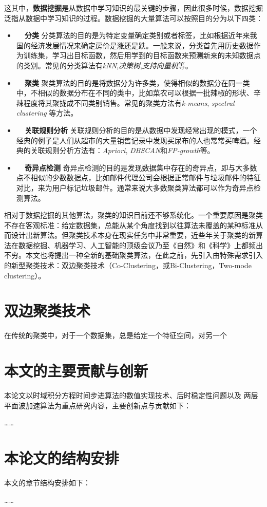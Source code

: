 \vspace{2mm}
这其中，\textbf{数据挖掘}是从数据中学习知识的最关键的步骤，因此很多时候，数据挖掘泛指从数据中学习知识的过程。数据挖掘的大量算法可以按照目的分为以下四类：

\begin{itemize}
    \item \textbf{~~分类} 分类算法的目的是为特定变量确定类别或者标签，比如根据近年来我国的经济发展情况来确定房价是涨还是跌。一般来说，分类首先用历史数据作为训练集，学习出目标函数，然后用学到的目标函数来预测新来的未知数据点的类别。常见的分类算法有\emph{kNN}\cite{peterson2009k},\emph{决策树}\cite{quinlan1986induction},\emph{支持向量机}\cite{cortes1995support}等。
    \item \textbf{~~聚类} 聚类算法的目的是将数据分为许多类，使得相似的数据分在同一类中，不相似的数据分布在不同的类中，比如菜农可以根据一批辣椒的形状、辛辣程度将其聚拢成不同类别销售。常见的聚类方法有\emph{k-means}\cite{hartigan1979algorithm}, \emph{spectral clustering}\cite{ng2002spectral} 等方法。
    \item \textbf{~~关联规则分析} 关联规则分析的目的是从数据中发现经常出现的模式，一个经典的例子是人们从超市的大量销售记录中发现买尿布的人也常常买啤酒。经典的关联规则分析方法有：\emph{Apriori}\cite{agrawal1994fast}, \emph{DBSCAN}\cite{ester1996density}和\emph{FP-growth}\cite{han2000mining}等。
    \item \textbf{~~奇异点检测} 奇异点检测的目的是发现数据集中存在的奇异点，即与大多数点不相似的少数数据点，比如邮件代理公司会根据正常邮件与垃圾邮件的特征对比，来为用户标记垃圾邮件。通常来说大多数聚类算法都可以作为奇异点检测算法。
\end{itemize}

\vspace{2mm}
相对于数据挖掘的其他算法，聚类的知识目前还不够系统化。一个重要原因是聚类不存在客观标准：给定数据集，总能从某个角度找到以往算法未覆盖的某种标准从而设计出新算法\cite{estivill2002so}。但聚类技术本身在现实任务中非常重要，近些年关于聚类的新算法在数据挖掘、机器学习、人工智能的顶级会议乃至《自然》和《科学》上都频出不穷。本文也将提出一种全新的基础聚类算法，在此之前，先引入由特殊需求引入的新型聚类技术：双边聚类技术（Co-Clustering，或Bi-Clustering，Two-mode clustering）。



\section{双边聚类技术}
在传统的聚类中，对于一个数据集，总是给定一个特征空间，对另一个

\section{本文的主要贡献与创新}
本论文以时域积分方程时间步进算法的数值实现技术、后时稳定性问题以及
两层平面波加速算法为重点研究内容，主要创新点与贡献如下：

……
\section{本论文的结构安排}
本文的章节结构安排如下：

……
